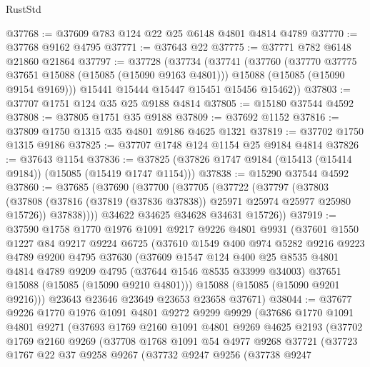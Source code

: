 \begin{lexlean}{RustStd}
\begin{coremodule}
@37768 := @37609 @783 @124 @22 @25 @6148 @4801 @4814 @4789
@37770 := @37768 @9162 @4795
@37771 := @37643 @22
@37775 := @37771 @782 @6148 @21860 @21864
@37797 := @37728
    (@37734
      (@37741
        (@37760
          (@37770 @37775 @37651 @15088 (@15085 (@15090 @9163 @4801)))
          @15088
          (@15085 (@15090 @9154 @9169)))
        @15441
        @15444
        @15447
        @15451
        @15456
        @15462))
@37803 := @37707 @1751 @124 @35 @25 @9188 @4814
@37805 := @15180 @37544 @4592
@37808 := @37805 @1751 @35 @9188
@37809 := @37692 @1152
@37816 := @37809 @1750 @1315 @35 @4801 @9186 @4625 @1321
@37819 := @37702 @1750 @1315 @9186
@37825 := @37707 @1748 @124 @1154 @25 @9184 @4814
@37826 := @37643 @1154
@37836 := @37825 (@37826 @1747 @9184 (@15413 (@15414 @9184)) (@15085 (@15419 @1747 @1154)))
@37838 := @15290 @37544 @4592
@37860 := @37685
    (@37690
      (@37700
        (@37705
          (@37722
            (@37797
              (@37803
                (@37808 (@37816 (@37819 (@37836 @37838)) @25971 @25974 @25977 @25980 @15726))
                @37838))))
        @34622
        @34625
        @34628
        @34631
        @15726))
@37919 := @37590
    @1758
    @1770
    @1976
    @1091
    @9217
    @9226
    @4801
    @9931
    (@37601
      @1550
      @1227
      @84
      @9217
      @9224
      @6725
      (@37610
        @1549
        @400
        @974
        @5282
        @9216
        @9223
        @4789
        @9200
        @4795
        @37630
        (@37609
          @1547
          @124
          @400
          @25
          @8535
          @4801
          @4814
          @4789
          @9209
          @4795
          (@37644 @1546 @8535 @33999 @34003)
          @37651
          @15088
          (@15085 (@15090 @9210 @4801)))
        @15088
        (@15085 (@15090 @9201 @9216)))
      @23643
      @23646
      @23649
      @23653
      @23658
      @37671)
@38044 := @37677
    @9226
    @1770
    @1976
    @1091
    @4801
    @9272
    @9299
    @9929
    (@37686
      @1770
      @1091
      @4801
      @9271
      (@37693
        @1769
        @2160
        @1091
        @4801
        @9269
        @4625
        @2193
        (@37702
          @1769
          @2160
          @9269
          (@37708
            @1768
            @1091
            @54
            @4977
            @9268
            @37721
            (@37723
              @1767
              @22
              @37
              @9258
              @9267
              (@37732
                @9247
                @9256
                (@37738
                  @9247

\end{coremodule}
\end{lexlean}
